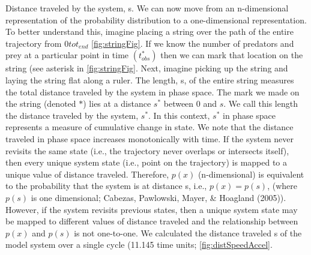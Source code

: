 \documentclass[12pt,twoside,openany]{reedthesis}
\begin{document}
Distance traveled by the system, s. We can now move from an n-dimensional representation of the probability distribution to a one-dimensional representation. To better understand this, imagine placing a string over the path of the entire trajectory from \(0 to t_{end}\) \ref{fig:stringFig}. If we know the number of predators and prey at a particular point in time \((t_{obs}^*)\) then we can mark that location on the string (see asterisk in \ref{fig:stringFig}. Next, imagine picking up the string and laying the string flat along a ruler. The length, s, of the entire string measures the total distance traveled by the system in phase space. The mark we made on the string (denoted \(*\)) lies at a distance \(s^*\) between 0 and \(s\). We call this length the distance traveled by the system, \(s^*\). In this context, \(s^*\) in phase space represents a measure of cumulative change in state. We note that the distance traveled in phase space increases monotonically with time. If the system never revisits the same state (i.e., the trajectory never overlaps or intersects itself), then every unique system state (i.e., point on the trajectory) is mapped to a unique value of distance traveled. Therefore, \(p(x)\) (n-dimensional) is equivalent to the probability that the system is at distance s, i.e., \(p(x)=p(s)\), (where \(p(s)\) is one dimensional; Cabezas, Pawlowski, Mayer, \& Hoagland (2005)). However, if the system revisits previous states, then a unique system state may be mapped to different values of distance traveled and the relationship between \(p(x)\) and \(p(s)\) is not one-to-one. We calculated the distance traveled s of the model system over a single cycle (11.145 time units; \ref{fig:distSpeedAccel}.
\end{document}
